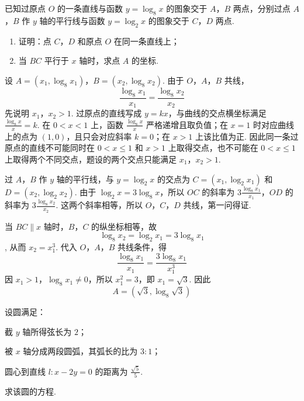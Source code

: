 \begin{problem}
已知过原点 \(O\) 的一条直线与函数 \(y = \log_{8} x\) 的图象交于 \(A\)，\(B\) 两点，分别过点 \(A\)，\(B\) 作 \(y\) 轴的平行线与函数 \(y = \log_{2} x\) 的图象交于 \(C\)，\(D\) 两点.

\begin{enumerate}
\item 证明：点 \(C\)，\(D\) 和原点 \(O\) 在同一条直线上；
\item 当 \(BC\) 平行于 \(x\) 轴时，求点 \(A\) 的坐标.
\end{enumerate}
\end{problem}

\begin{solution}
设 \(A=(x_1,\log_8x_1)\)，\(B=(x_2,\log_8x_2)\). 由于 \(O\)，\(A\)，\(B\) 共线，
\[
\frac{\log_8x_1}{x_1}=\frac{\log_8x_2}{x_2}
\]
先说明 \(x_1\)，\(x_2>1\). 过原点的直线写成 \(y=kx\)，与曲线的交点横坐标满足 \(\frac{\log_8x}{x}=k\). 在 \(0<x<1\) 上，函数 \(\frac{\log_8x}{x}\) 严格递增且取负值；在 \(x=1\) 时对应曲线上的点为 \((1,0)\)，且只会对应斜率 \(k=0\)；在 \(x>1\) 上该比值为正. 因此同一条过原点的直线不可能同时在 \(0<x\leqslant1\) 和 \(x>1\) 上取得交点，也不可能在 \(0<x\leqslant1\) 上取得两个不同交点，题设的两个交点只能满足 \(x_1\)，\(x_2>1\).

过 \(A\)，\(B\) 作 \(y\) 轴的平行线，与 \(y=\log_2x\) 的交点为 \(C=(x_1,\log_2x_1)\) 和 \(D=(x_2,\log_2x_2)\). 由于 \(\log_2x=3\log_8x\)，所以 \(OC\) 的斜率为 \(3\frac{\log_8x_1}{x_1}\)，\(OD\) 的斜率为 \(3\frac{\log_8x_2}{x_2}\).
这两个斜率相等，所以 \(O\)，\(C\)，\(D\) 共线，第一问得证.

当 \(BC\parallel x\) 轴时，\(B\)，\(C\) 的纵坐标相等，故
\[
\log_8x_2=\log_2x_1=3\log_8x_1
\],
从而 \(x_2=x_1^3\). 代入 \(O\)，\(A\)，\(B\) 共线条件，得
\[
\frac{\log_8x_1}{x_1}
=\frac{3\log_8x_1}{x_1^3}
\]
因 \(x_1>1\)，\(\log_8x_1\ne0\)，所以 \(x_1^2=3\)，即 \(x_1=\sqrt3\). 因此
\[
A=\left(\sqrt3,\log_8\sqrt3\right)
\]
\end{solution}

\begin{problem}
设圆满足：
\begin{circlelist}
\item 截 \(y\) 轴所得弦长为 \(2\)；
\item 被 \(x\) 轴分成两段圆弧，其弧长的比为 \(3:1\)；
\item 圆心到直线 \(l: x - 2y = 0\) 的距离为 \(\frac{\sqrt{5}}{5}\).
\end{circlelist}
求该圆的方程.
\end{problem}

